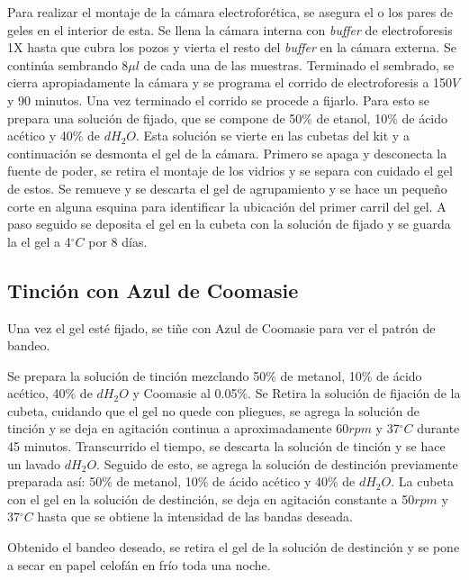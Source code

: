 \documentclass[%
 reprint,
 amsmath,amssymb,
 aps,
showkeys,
letter,
12pts
]{revtex4-1}
\begin{document}
		Para realizar el montaje de la cámara electroforética, se asegura el o los pares de geles en el interior de esta. Se llena la cámara interna con \textit{buffer} de electroforesis 1X hasta que cubra los pozos y vierta el resto del \textit{buffer} en la cámara externa. Se continúa sembrando 8$\mu l$ de cada una de las muestras. Terminado el sembrado, se cierra apropiadamente la cámara y se programa el corrido de electroforesis a 150$V$ y 90 minutos. Una vez terminado el corrido se procede a fijarlo. Para esto se prepara una solución de fijado, que se compone de 50\% de etanol, 10\% de ácido acético y 40\% de $dH_2O$. Esta solución se vierte en las cubetas del kit y a continuación se desmonta el gel de la cámara. Primero se apaga y desconecta la fuente de poder, se retira el montaje de los vidrios y se separa con cuidado el gel de estos. Se remueve y se descarta el gel de agrupamiento y se hace un pequeño corte en alguna esquina para identificar la ubicación del primer carril del gel. A paso seguido se deposita el gel en la cubeta con la solución de fijado y se guarda la el gel a 4$^{\circ}C$ por 8 días.

		
	\subsection{\label{sec:TinMet}Tinción con Azul de Coomasie}\cite{guia}
		Una vez el gel esté fijado, se tiñe con Azul de Coomasie para ver el patrón de bandeo.
		
		Se prepara la solución de tinción mezclando 50\% de metanol, 10\% de ácido acético, 40\% de $dH_2O$ y Coomasie al 0.05\%. Se Retira la solución de fijación de la cubeta, cuidando que el gel no quede con pliegues, se agrega la solución de tinción y se deja en agitación continua a aproximadamente 60$rpm$ y 37$^{\circ}C$ durante 45 minutos. Transcurrido el tiempo, se descarta la solución de tinción y se hace un lavado $dH_2O$. Seguido de esto, se agrega la solución de destinción previamente preparada así: 50\% de metanol, 10\% de ácido acético y 40\% de $dH_2O$. La cubeta con el gel en la solución de destinción, se deja en agitación constante a 50$rpm$ y 37$^{\circ}C$ hasta que se obtiene la intensidad de las bandas deseada.
		
		Obtenido el bandeo deseado, se retira el gel de la solución de destinción y se pone a secar en papel celofán en frío toda una noche.
		
\end{document}
